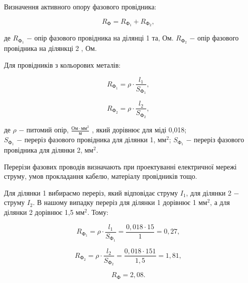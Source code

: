 \vspace{1.5em}

Визначення активного опору фазового провідника:

\begin{equation}\label{eq:work10}
	R_{\text{Ф}} = R_{\text{Ф}_{1}} + R_{\text{Ф}_{2}},
\end{equation}

\noindent де $R_{\text{Ф}_{1}}$ $-$ опір фазового провідника на ділянці 1 та, Ом.\newline
\hspace*{15pt} $R_{\text{Ф}_{2}}$ $-$ опір фазового провідника на ділянкці 2 , Ом.

Для провідників з кольорових металів:

\begin{equation}\label{eq:work11}
	R_{\text{Ф}_{1}} = \rho \cdot \frac{l_{1}}{S_{\text{Ф}_{1}}},
\end{equation}

\begin{equation}\label{eq:work12}
	R_{\text{Ф}_{2}} = \rho \cdot \frac{l_{2}}{S_{\text{Ф}_{2}}},
\end{equation}

\noindent де $\rho$ $-$ питомий опір, $\frac{\text{Ом} \cdot \text{мм}^{2}}{\text{м}}$ , який дорівнює для міді 0,018; \\
\hspace*{15pt} $S_{\text{Ф}_{1}}$ $-$ переріз фазового провідника для ділянки 1, $\text{мм}^{2}$;\newline
\hspace*{15pt} $S_{\text{Ф}_{1}}$ $-$ переріз фазового провідника для ділянки 2, $\text{мм}^{2}$.

\vspace{1.5em}

Перерізи фазових проводів визначають при проектуванні електричної мережі струму, умов прокладання кабелю, матеріалу провідників тощо.

Для ділянки 1 вибираємо переріз, який відповідає струму $I_{1}$, для ділянки 2 $-$ струму $I_{2}$. В нашому випадку переріз для ділянки 1 дорівнює 1 $\text{мм}^{2}$, а для ділянки 2  дорівнює 1,5 $\text{мм}^{2}$. Тому:

\[
	R_{\text{Ф}_{1}} = \rho \cdot \frac{l_{1}}{S_{\text{Ф}_{1}}} = \frac{0,018 \cdot 15}{1} = 0,27,
\]

\[
	R_{\text{Ф}_{2}} = \rho \cdot \frac{l_{2}}{S_{\text{Ф}_{2}}} = \frac{0,018 \cdot 151}{1,5} = 1,81,
\]

\[
	R_{\text{Ф}} = 2,08.
\]

